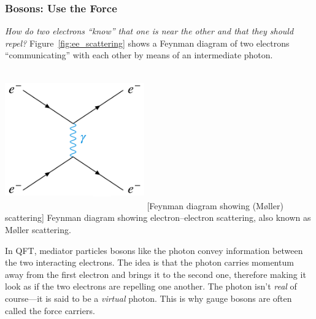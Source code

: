 \subsubsection{Bosons: Use the Force}
\emph{How do two electrons ``know'' that one is near the other and that they should repel?}
Figure~\ref{fig:ee_scattering} shows a Feynman diagram of two electrons ``communicating'' with each other by means of an intermediate photon.
\begin{multiFigure}
    \centering
    \includegraphics[width=6cm,height=6cm,keepaspectratio]{figures/sm/ee_scattering_moeller.png}
            [Feynman diagram showing \ee (Møller) scattering]
            {Feynman diagram showing electron--electron scattering, also known as Møller scattering.} 
        \label{fig:ee_scattering}
    \end{multiFigure}
In QFT, mediator particles bosons like the photon convey information between the two interacting electrons.
The idea is that the photon carries momentum away from the first electron and brings it to the second one, therefore making it look as if the two electrons are repelling one another.
The photon isn't \emph{real} of course---it is said to be a \emph{virtual} photon.
This is why gauge bosons are often called the force carriers.

